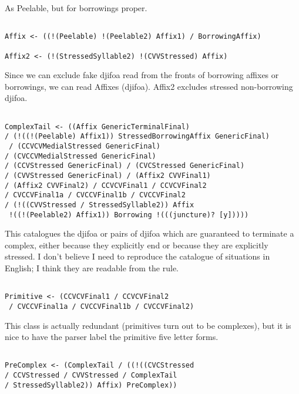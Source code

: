 \documentclass[12pt]{article}
\begin{document}
As Peelable, but for borrowings proper.

\begin{verbatim}

Affix <- ((!(Peelable) !(Peelable2) Affix1) / BorrowingAffix)

Affix2 <- (!(StressedSyllable2) !(CVVStressed) Affix)

\end{verbatim}

Since we can exclude fake djifoa read from the fronts of borrowing affixes or borrowings, we can
read Affixes (djifoa).  Affix2 excludes stressed non-borrowing djifoa.

\begin{verbatim}

ComplexTail <- ((Affix GenericTerminalFinal) 
/ (!((!(Peelable) Affix1)) StressedBorrowingAffix GenericFinal)
 / (CCVCVMedialStressed GenericFinal) 
/ (CVCCVMedialStressed GenericFinal) 
/ (CCVStressed GenericFinal) / (CVCStressed GenericFinal) 
/ (CVVStressed GenericFinal) / (Affix2 CVVFinal1) 
/ (Affix2 CVVFinal2) / CCVCVFinal1 / CCVCVFinal2 
/ CVCCVFinal1a / CVCCVFinal1b / CVCCVFinal2 
/ (!((CVVStressed / StressedSyllable2)) Affix
 !((!(Peelable2) Affix1)) Borrowing !(((juncture)? [y]))))

\end{verbatim}

This catalogues the djifoa or pairs of djifoa which are guaranteed to terminate a complex, either because
they explicitly end or because they are explicitly stressed.  I don't believe I need to reproduce the catalogue
of situations in English; I think they are readable from the rule.

\begin{verbatim}

Primitive <- (CCVCVFinal1 / CCVCVFinal2
 / CVCCVFinal1a / CVCCVFinal1b / CVCCVFinal2)

\end{verbatim}

This class is actually redundant (primitives turn out to be complexes), but it is nice to have the parser label the primitive five letter forms.

\begin{verbatim}

PreComplex <- (ComplexTail / ((!((CVCStressed 
/ CCVStressed / CVVStressed / ComplexTail 
/ StressedSyllable2)) Affix) PreComplex))

\end{verbatim}
\end{document}
